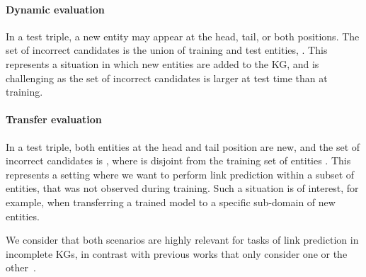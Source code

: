 \documentclass[sigconf]{acmart}
\begin{document}
\paragraph{Dynamic evaluation} In a test triple, a new entity may appear at the head, tail, or both positions. The set of incorrect candidates  is the union of training and test entities, . This represents a situation in which new entities are added to the KG, and is challenging as the set of incorrect candidates is larger at test time than at training.
\paragraph{Transfer evaluation} In a test triple, both entities at the head and tail position are new, and the set of incorrect candidates  is , where  is disjoint from the training set of entities . This represents a setting where we want to perform link prediction within a subset of entities, that was not observed during training. Such a situation is of interest, for example, when transferring a trained model to a specific sub-domain of new entities.

We consider that both scenarios are highly relevant for tasks of link prediction in incomplete KGs, in contrast with previous works that only consider one or the other~\cite{xie2016RepresentationLO,wang2019kepler}.
\end{document}
